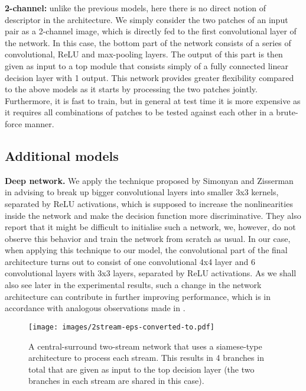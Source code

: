 \documentclass[10pt,twocolumn,letterpaper]{article}
\newcommand*{\USEIMAGES}{}
\begin{document}
\textbf{2-channel:} unlike the previous models, here there is no direct notion of descriptor in the  architecture. We simply consider the two patches of  an input pair as a 2-channel image, which is directly fed to the first convolutional layer of the network. In this case, the bottom part of the network  consists of  a series of convolutional, ReLU and max-pooling layers. The output of this part is then given as input to a top module that  consists simply of a fully connected linear decision layer with 1 output.
This network provides greater flexibility compared to the above models as it starts by processing the two patches jointly. Furthermore, it is fast to train, but in general at test time it is more expensive as it requires all 
combinations of patches to be tested against each other in a brute-force manner.

\subsection{Additional models}\label{sec:extra_models}
\textbf{Deep network.} We apply the technique proposed by Simonyan and Zisserman 
in \cite{verydeep}  advising to break up bigger convolutional layers into smaller 3x3 kernels, 
separated by ReLU activations, which is supposed to increase the nonlinearities inside the network and  make the decision function more  discriminative. 
They also report that it might be difficult to initialise such a network, we, however, do not 
observe this behavior and train the network from scratch as usual. In our case,  when applying this technique to our model, the convolutional part of the final architecture turns out to consist of one
convolutional 4x4 layer and 6 convolutional layers with 3x3 layers, separated by ReLU
activations. As we shall also see later in the experimental results, such a change in the network architecture can contribute in further improving performance, which is in accordance with analogous observations made in \cite{verydeep}.


\ifdefined\USEIMAGES
\begin{figure}
\small
\begin{center}
\texttt{[image: images/2stream-eps-converted-to.pdf]}
\end{center}
\vspace{-8pt}
\caption{A central-surround two-stream network that uses a siamese-type architecture to process each stream. This results in 4 branches in total that are given as input to the top decision layer (the two branches in each stream are shared in this case).}
\vspace{-12pt}
\small
\label{fig:2stream}
\end{figure}
\fi
\end{document}
